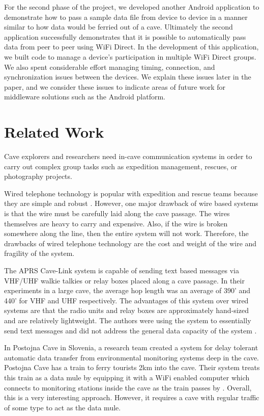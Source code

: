 \documentclass[10pt,twocolumn]{article}
\begin{document}
For the second phase of the project, we developed another Android application to demonstrate how to pass a sample data file from device to device in a manner similar to how data would be ferried out of a cave.
Ultimately the second application successfully demonstrates that it is possible to automatically pass data from peer to peer using WiFi Direct. 
In the development of this application, we built code to manage a device's participation in multiple WiFi Direct groups.
We also spent considerable effort managing timing, connection, and synchronization issues between the devices.
We explain these issues later in the paper, and we consider these issues to indicate areas of future work for middleware solutions
such as the Android platform.

\section{Related Work}
\label{sec:Related}
Cave explorers and researchers need in-cave communication systems in order to carry out complex group tasks such as expedition management, rescues, or photography projects.

Wired telephone technology is popular with expedition and rescue teams because they are simple and robust \cite{cavecomm}.
However, one major drawback of wire based systems is that the wire must be carefully laid along the cave passage. 
The wires themselves are heavy to carry and expensive.
Also, if the wire is broken somewhere along the line, then the entire system will not work.
Therefore, the drawbacks of wired telephone technology are the cost and weight of the wire and fragility of the system.

The APRS Cave-Link system is capable of sending text based messages via VHF/UHF walkie talkies or relay boxes placed along a cave passage.
In their experiments in a large cave, the average hop length was an average of 390' and 440' for VHF and UHF respectively.
The advantages of this system over wired systems are that the radio units and relay boxes are approximately hand-sized and are relatively lightweight.
The authors were using the system to essentially send text messages and did not address the general data capacity of the system \cite{cavelink}.

In Postojna Cave in Slovenia, a research team created a system for delay tolerant automatic data transfer from environmental monitoring systems deep in the cave.
Postojna Cave has a train to ferry tourists 2km into the cave.
Their system treats this train as a data mule by equipping it with a WiFi enabled computer which connects to monitoring stations inside the cave as the train passes by \cite{postojna2014}.
Overall, this is a very interesting approach. 
However, it requires a cave with regular traffic of some type to act as the data mule.
\end{document}
